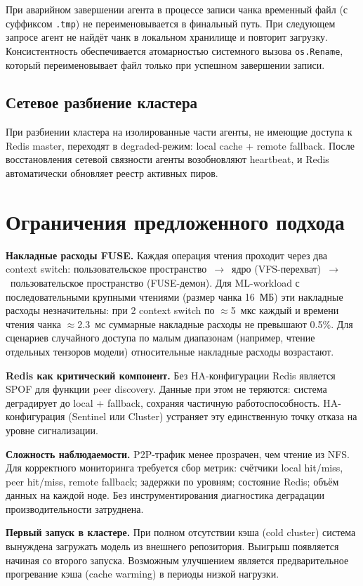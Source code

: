 При аварийном завершении агента в процессе записи чанка временный файл (с суффиксом \texttt{.tmp}) не переименовывается в финальный путь. При следующем запросе агент не найдёт чанк в локальном хранилище и повторит загрузку. Консистентность обеспечивается атомарностью системного вызова \texttt{os.Rename}, который переименовывает файл только при успешном завершении записи.

\subsection*{Сетевое разбиение кластера}

При разбиении кластера на изолированные части агенты, не имеющие доступа к Redis master, переходят в degraded-режим: local cache + remote fallback. После восстановления сетевой связности агенты возобновляют heartbeat, и Redis автоматически обновляет реестр активных пиров.

\section{Ограничения предложенного подхода}

\textbf{Накладные расходы FUSE.} Каждая операция чтения проходит через два context switch: пользовательское пространство~$\to$~ядро (VFS-перехват)~$\to$~пользовательское пространство (FUSE-демон). Для ML-workload с последовательными крупными чтениями (размер чанка 16~МБ) эти накладные расходы незначительны: при 2 context switch по $\approx$5~мкс каждый и времени чтения чанка $\approx$2.3~мс суммарные накладные расходы не превышают 0.5\%. Для сценариев случайного доступа по малым диапазонам (например, чтение отдельных тензоров модели) относительные накладные расходы возрастают.

\textbf{Redis как критический компонент.} Без HA-конфигурации Redis является SPOF для функции peer discovery. Данные при этом не теряются: система деградирует до local + fallback, сохраняя частичную работоспособность. HA-конфигурация (Sentinel или Cluster) устраняет эту единственную точку отказа на уровне сигнализации.

\textbf{Сложность наблюдаемости.} P2P-трафик менее прозрачен, чем чтение из NFS. Для корректного мониторинга требуется сбор метрик: счётчики local hit/miss, peer hit/miss, remote fallback; задержки по уровням; состояние Redis; объём данных на каждой ноде. Без инструментирования диагностика деградации производительности затруднена.

\textbf{Первый запуск в кластере.} При полном отсутствии кэша (cold cluster) система вынуждена загружать модель из внешнего репозитория. Выигрыш появляется начиная со второго запуска. Возможным улучшением является предварительное прогревание кэша (cache warming) в периоды низкой нагрузки.

